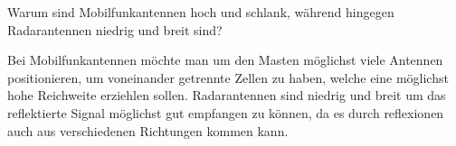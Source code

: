 \begin{question}[section=13,name={Mobilfunkantennen},difficulty=,quantity=,type=thr,tags={}]
	Warum sind Mobilfunkantennen hoch und schlank, während hingegen Radarantennen niedrig und breit sind? 
	
	
\end{question}
\begin{solution}
	Bei Mobilfunkantennen möchte man um den Masten möglichst viele Antennen positionieren, um voneinander getrennte Zellen zu haben, welche eine möglichst hohe Reichweite erziehlen sollen.
	Radarantennen sind niedrig und breit um das reflektierte Signal möglichst gut empfangen zu können, da es durch reflexionen auch aus verschiedenen Richtungen kommen kann.
\end{solution}